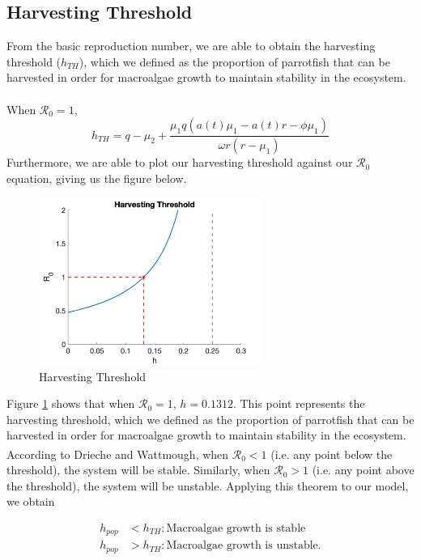 \documentclass[12pt]{article}
\begin{document}
\subsection{Harvesting Threshold}
From the basic reproduction number, we are able to obtain the harvesting threshold ($h_{TH}$), which we defined as the proportion of parrotfish that can be harvested in order for macroalgae growth to maintain stability in the ecosystem. \\
\\
When $\mathscr{R}_{0} = 1$,
\begin{equation*}
    \displaystyle{h_{TH} = q - \mu_{2} + \frac{\mu_{1}q(a(t) \mu_{1} - a(t)r - \phi \mu_{1})}{\omega r(r-\mu_{1})}}
    \label{eq:h_TH}
\end{equation*}
Furthermore, we are able to plot our harvesting threshold against our $\mathscr{R}_{0}$ equation, giving us the figure below.

\begin{figure}[H]
    \centering
    \includegraphics[width=0.65\textwidth]{Latex/Figures/Graphs/threshold_graph.png}
    \caption{Harvesting Threshold}
    \label{fig:threshold_graph}
\end{figure}

Figure \ref{fig:threshold_graph} shows that when $\mathscr{R}_{0} = 1$, $h=0.1312$. This point represents the harvesting threshold, which we defined as the proportion of parrotfish that can be harvested in order for macroalgae growth to maintain stability in the ecosystem. According to Drieche and Wattmough\textsuperscript{\cite{bible}}, when $\mathscr{R}_{0} < 1$ (i.e. any point below the threshold), the system will be stable. Similarly, when $\mathscr{R}_{0} > 1$ (i.e. any point above the threshold), the system will be unstable. Applying this theorem to our model, we obtain 

\begin{align*}
    h_{pop} &< h_{TH}: \text{Macroalgae growth is stable} \\
    h_{pop} &> h_{TH}: \text{Macroalgae growth is unstable.}
\end{align*}
\end{document}
